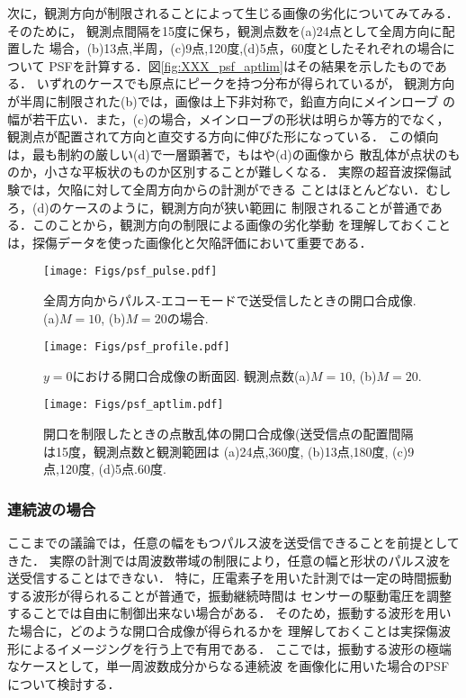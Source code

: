 次に，観測方向が制限されることによって生じる画像の劣化についてみてみる．
そのために， 観測点間隔を15度に保ち，観測点数を(a)24点として全周方向に配置した
場合，(b)13点,半周，(c)9点,120度,(d)5点，60度としたそれぞれの場合について
PSFを計算する．図\ref{fig:XXX_psf_aptlim}はその結果を示したものである．
いずれのケースでも原点にピークを持つ分布が得られているが，
観測方向が半周に制限された(b)では，画像は上下非対称で，鉛直方向にメインローブ
の幅が若干広い．また，(c)の場合，メインローブの形状は明らか等方的でなく，
観測点が配置されて方向と直交する方向に伸びた形になっている．
この傾向は，最も制約の厳しい(d)で一層顕著で，もはや(d)の画像から
散乱体が点状のものか，小さな平板状のものか区別することが難しくなる．
実際の超音波探傷試験では，欠陥に対して全周方向からの計測ができる
ことはほとんどない．むしろ，(d)のケースのように，観測方向が狭い範囲に
制限されることが普通である．このことから，観測方向の制限による画像の劣化挙動
を理解しておくことは，探傷データを使った画像化と欠陥評価において重要である．
\begin{figure}[h]
	\begin{center}
	\texttt{[image: Figs/psf\_pulse.pdf]} 
	\end{center}
	\caption{全周方向からパルス-エコーモードで送受信したときの開口合成像.(a)$M=10$, (b)$M=20$の場合.} 
	\label{fig:XXX_psf_pulse}
\end{figure}
\begin{figure}[h]
	\begin{center}
	\texttt{[image: Figs/psf\_profile.pdf]} 
	\end{center}
	\caption{$y=0$における開口合成像の断面図. 観測点数(a)$M=10$, (b)$M=20$.}
	\label{fig:XXX_psf_profile} 
\end{figure}
\begin{figure}[h]
	\begin{center}
	\texttt{[image: Figs/psf\_aptlim.pdf]} 
	\end{center}
	\caption{開口を制限したときの点散乱体の開口合成像(送受信点の配置間隔は15度，観測点数と観測範囲は
	(a)24点,360度, (b)13点,180度, (c)9点,120度, (d)5点.60度.} 
	\label{fig:XXX_100}
\end{figure}
\subsubsection{連続波の場合}
ここまでの議論では，任意の幅をもつパルス波を送受信できることを前提としてきた．
実際の計測では周波数帯域の制限により，任意の幅と形状のパルス波を送受信することはできない．
特に，圧電素子を用いた計測では一定の時間振動する波形が得られることが普通で，振動継続時間は
センサーの駆動電圧を調整することでは自由に制御出来ない場合がある．
そのため，振動する波形を用いた場合に，どのような開口合成像が得られるかを
理解しておくことは実探傷波形によるイメージングを行う上で有用である．
ここでは，振動する波形の極端なケースとして，単一周波数成分からなる連続波
を画像化に用いた場合のPSFについて検討する．


